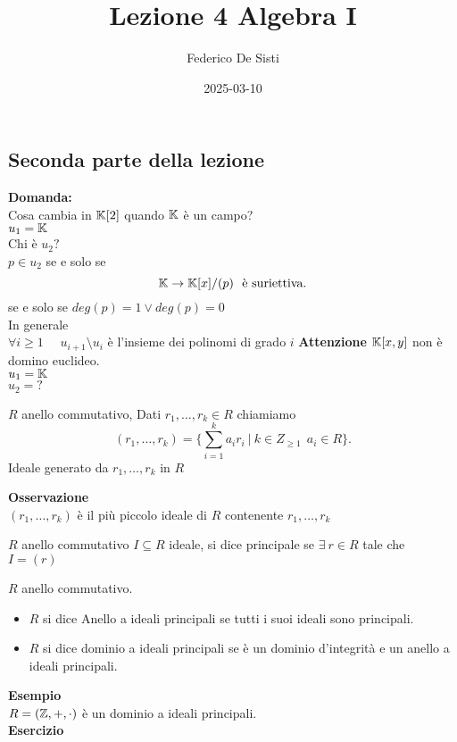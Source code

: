 \documentclass[12px]{article}
\title{Lezione 4 Algebra I}
\date{2025-03-10}
\author{Federico De Sisti}
\begin{document}
	\maketitle
	\newpage
	\subsection{Seconda parte della lezione}
	\textbf{Domanda:}\\
	Cosa cambia in $\mathbb{K}[2]$ quando  $\mathbb{K}$ è un campo?\\
	$u_1 = \mathbb{K}$ \\
	Chi è $u_2 ?$\\
	$p\in u_2$ se e solo se
	\[
		\K \rightarrow \K[x]/(p) \ \text{ è suriettiva}
	.\] 
	se e solo se $deg(p) = 1 \vee deg(p) = 0$\\
	In generale\\
	$\forall i\geq 1$ \ \  $u_{i+1}\setminus u_i$ è l'insieme dei polinomi di grado $i$
	\textbf{Attenzione} $\mathbb{K}[x,y]$ non è domino euclideo.\\
	$u_1 = \mathbb{K}$\\
	 $u_2 = ?$\\
	 \begin{defi}
	 	$R$ anello commutativo, Dati $r_1,\ldots, r_k\in R$ chiamiamo
		\[
			(r_1,\ldots,r_k) = \{ \sum^{k}_{i=1}a_ir_i \ | \ k\in Z_{\geq 1}\ \ a_i\in R\}
		.\] 
Ideale generato da $r_1,\ldots, r_k$ in $R$\\
	 \end{defi}
\textbf{Osservazione}\\
$(r_1,\ldots, r_k)$ è il più piccolo ideale di $R$ contenente $r_1,\ldots,r_k$
\begin{defi}
	$R$ anello commutativo $I\subseteq R$ ideale, si dice principale se $\exists \ r\in R$ tale che $I = (r)$
\end{defi}
\begin{defi}
	$R$ anello commutativo.
	\begin{itemize}
		\item $R$ si dice Anello a ideali principali se tutti i suoi ideali sono principali.
		\item  $R$ si dice dominio a ideali principali se è un dominio d'integrità e un anello a ideali principali.
	\end{itemize}
\end{defi}
\textbf{Esempio}\\
$R = (\mathbb{Z},+,\cdot)$ è un dominio a ideali principali.\\
\textbf{Esercizio}\\
\end{document}
